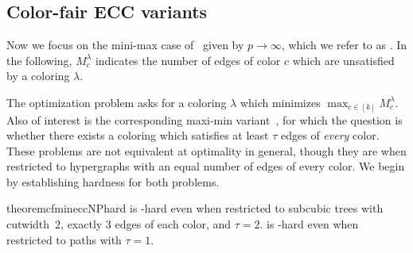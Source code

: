 \subsection{Color-fair ECC variants}\label{sec:color-fair}

Now we focus on the mini-max case of~\pmeanECC{} given by $p \rightarrow \infty$, which we refer to as \cfminECC{}.
In the following, $M_c^\lambda$ indicates the number of edges of color $c$ which are unsatisfied by a coloring $\lambda$.


The optimization problem asks for a coloring $\lambda$ which minimizes $\max_{c \in [k]} M_c^\lambda$.
Also of interest is the corresponding maxi-min variant~\cfmaxECC{}, for which the question is whether there exists a coloring which satisfies at least $\tau$ edges of \emph{every} color.
These problems are not equivalent at optimality in general, though they are when restricted to hypergraphs with an equal number of edges of every color.
We begin by establishing hardness for both problems.
%
\begin{restatable}{theorem}{cfmineccNPhard}\label{thm:cfminecc-NPhard}
    \cfminECC{} is -hard even when restricted to subcubic trees with cutwidth~$2$, exactly $3$ edges of each color, and $\tau = 2$. \cfmaxECC{} is -hard even when restricted to paths with $\tau = 1$.
\end{restatable}
%

